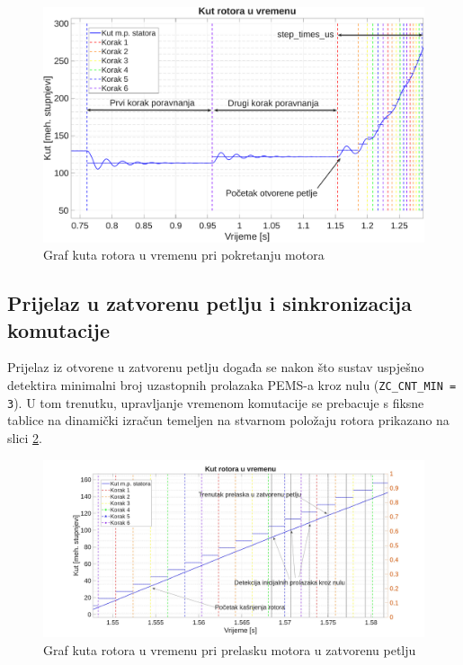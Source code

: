 \documentclass[diplomskirad]{fer}
\begin{document}
\begin{figure}[h!]
	\centering
	\includegraphics[width=\textwidth]{csv/pokretanje.pdf}
	\caption{Graf kuta rotora u vremenu pri pokretanju motora}
	\label{fig:pokretanje}
\end{figure}

\subsection{Prijelaz u zatvorenu petlju i sinkronizacija komutacije}
\label{ssec:prijelaz_u_zatvorenu_petlju}

Prijelaz iz otvorene u zatvorenu petlju događa se nakon što sustav uspješno
detektira minimalni broj uzastopnih prolazaka PEMS-a kroz nulu
(\texttt{ZC\_CNT\_MIN = 3}). U tom trenutku, upravljanje vremenom komutacije se
prebacuje s fiksne tablice na dinamički izračun temeljen na stvarnom položaju
rotora prikazano na slici \ref{fig:closed_loop}.

\begin{figure}[h!]
	\centering
	\includegraphics[width=\textwidth]{csv/closed_loop.pdf}
	\caption{Graf kuta rotora u vremenu pri prelasku motora u zatvorenu petlju}
	\label{fig:closed_loop}
\end{figure}
\end{document}
